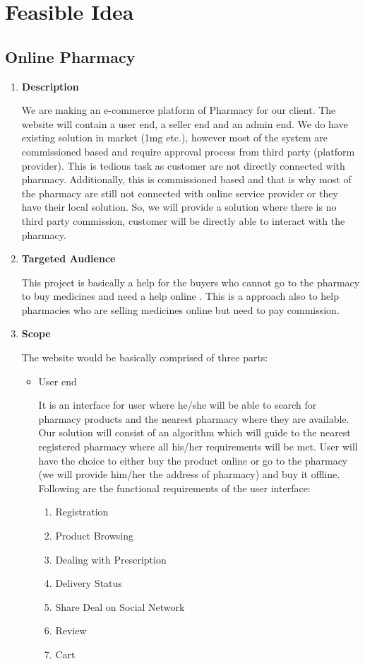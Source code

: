 \documentclass[fleqn,10pt]{../SelfArx} %
\begin{document}
\section{Feasible Idea}

\subsection{Online Pharmacy}

\vspace{0.5cm}
\begin{enumerate}
\item \textbf{Description}

We are making an e-commerce platform of Pharmacy for our
client. The website will contain a user end, a seller end and an admin end. We
do have existing solution in market (1mg etc.), however most of the system are
commissioned based and require approval process from third party (platform
provider). This is tedious task as customer are not directly connected with
pharmacy. Additionally, this is commissioned based and that is why most of
the pharmacy are still not connected with online service provider or they have
their local solution. So, we will provide a solution where there is no third party
commission, customer will be directly able to interact with the pharmacy.
\item \textbf{Targeted Audience}

This project is basically a help for the buyers who cannot go to the pharmacy to buy medicines and need a help online . This is a approach also to help pharmacies who are selling medicines online but need to pay commission.

\item \textbf{Scope}

The website would be basically comprised of three parts:
\begin{itemize}
    \item User end
   
It is an interface for user where he/she will be able to search for pharmacy products and the nearest pharmacy where they are available. Our solution will consist of an algorithm which will guide to the nearest registered pharmacy where all his/her requirements will be met. User will have the choice to either buy the product online or go to the pharmacy (we will provide him/her the address of pharmacy) and buy it offline. Following are the functional requirements of the user interface:

\begin{enumerate}
    \item 
Registration 
 \item 	Product Browsing
 \item 	Dealing with Prescription
 \item 	Delivery Status 
 \item 	Share Deal on Social Network 
 \item 	Review 
 \item 	Cart
\end{enumerate}


\end{itemize}
\end{enumerate}
\end{document}
